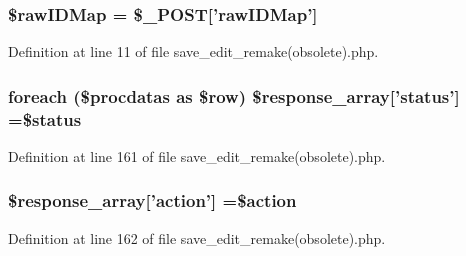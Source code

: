 \hypertarget{save__edit__remake_07obsolete_08_8php_a2c543a123b646cdf11c814983d4a13cf}{
\subsubsection[{\$raw\-I\-D\-Map}]{\setlength{\rightskip}{0pt plus 5cm}\$raw\-I\-D\-Map = \$\-\_\-\-P\-O\-S\-T\mbox{[}'raw\-I\-D\-Map'\mbox{]}}}\label{save__edit__remake_07obsolete_08_8php_a2c543a123b646cdf11c814983d4a13cf}


Definition at line 11 of file save\-\_\-edit\-\_\-remake(obsolete).\-php.

\hypertarget{save__edit__remake_07obsolete_08_8php_a7a23fc905184e8d9769c6c2948032a18}{
\subsubsection[{\$response\-\_\-array}]{\setlength{\rightskip}{0pt plus 5cm}foreach (\$procdatas as \$row) \$response\-\_\-array\mbox{[}'status'\mbox{]} =\$status}}\label{save__edit__remake_07obsolete_08_8php_a7a23fc905184e8d9769c6c2948032a18}


Definition at line 161 of file save\-\_\-edit\-\_\-remake(obsolete).\-php.

\hypertarget{save__edit__remake_07obsolete_08_8php_ae768978a0cdc416c0d63d798c85c8784}{
\subsubsection[{\$response\-\_\-array}]{\setlength{\rightskip}{0pt plus 5cm}\$response\-\_\-array\mbox{[}'action'\mbox{]} =\$action}}\label{save__edit__remake_07obsolete_08_8php_ae768978a0cdc416c0d63d798c85c8784}


Definition at line 162 of file save\-\_\-edit\-\_\-remake(obsolete).\-php.

